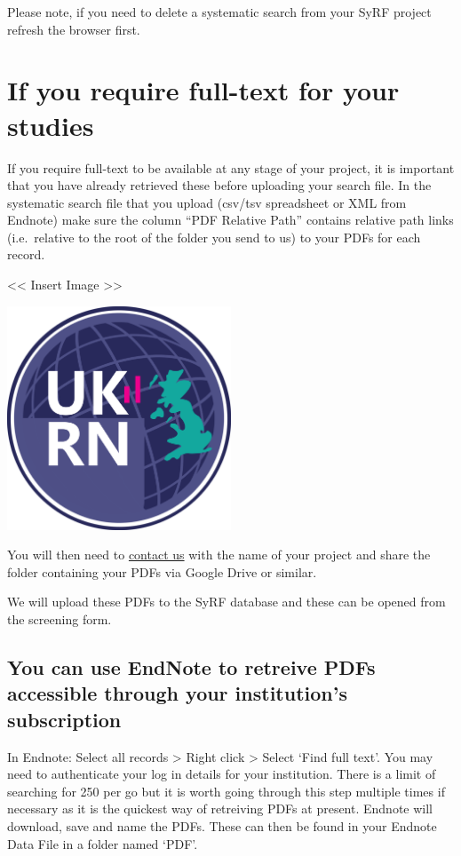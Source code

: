 \documentclass[]{book}
\begin{document}
Please note, if you need to delete a systematic search from your SyRF
project refresh the browser first.

\section{If you require full-text for your
studies}\label{if-you-require-full-text-for-your-studies}

If you require full-text to be available at any stage of your project,
it is important that you have already retrieved these before uploading
your search file. In the systematic search file that you upload (csv/tsv
spreadsheet or XML from Endnote) make sure the column ``PDF Relative
Path'' contains relative path links (i.e.~relative to the root of the
folder you send to us) to your PDFs for each record.

\textless{}\textless{} Insert Image \textgreater{}\textgreater{}

\includegraphics[width=0.50000\textwidth,height=0.50000\textwidth]{figs/evidence-triangle.png}

You will then need to \href{syrf.info@ed.ac.uk}{contact us} with the
name of your project and share the folder containing your PDFs via
Google Drive or similar.

We will upload these PDFs to the SyRF database and these can be opened
from the screening form.

\subsection{You can use EndNote to retreive PDFs accessible through your
institution's
subscription}\label{you-can-use-endnote-to-retreive-pdfs-accessible-through-your-institutions-subscription}

In Endnote: Select all records \textgreater{} Right click \textgreater{}
Select `Find full text'. You may need to authenticate your log in
details for your institution. There is a limit of searching for 250 per
go but it is worth going through this step multiple times if necessary
as it is the quickest way of retreiving PDFs at present. Endnote will
download, save and name the PDFs. These can then be found in your
Endnote Data File in a folder named `PDF'.
\end{document}
